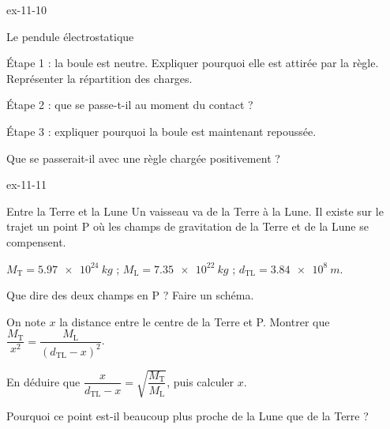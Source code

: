 \begin{blocLivre}{ex-11-10}
\begin{exercice}[2]{Le pendule électrostatique}
\begin{questions}
\item Étape 1 : la boule est neutre. Expliquer pourquoi elle est attirée par la règle. Représenter la répartition des charges.
\item Étape 2 : que se passe-t-il au moment du contact ?
\item Étape 3 : expliquer pourquoi la boule est maintenant repoussée.
\item Que se passerait-il avec une règle chargée positivement ?
\end{questions}
\end{exercice}
\end{blocLivre}
\begin{blocLivre}{ex-11-11}
\begin{exercice}[2]{Entre la Terre et la Lune}
Un vaisseau va de la Terre à la Lune. Il existe sur le trajet un point P où les champs de gravitation de la Terre et de la
Lune se compensent.
\begin{donnees}
$M_\mathrm{T}=\qty{5,97e24}{kg}$ ; $M_\mathrm{L}=\qty{7,35e22}{kg}$ ; $d_\mathrm{TL}=\qty{3,84e8}{m}$.
\end{donnees}
\begin{questions}
\item Que dire des deux champs en P ? Faire un schéma.
\item On note $x$ la distance entre le centre de la Terre et P. Montrer que $\dfrac{M_\mathrm{T}}{x^2}=\dfrac{M_\mathrm{L}}{(d_\mathrm{TL}-x)^2}$.
\item En déduire que $\dfrac{x}{d_\mathrm{TL}-x}=\sqrt{\dfrac{M_\mathrm{T}}{M_\mathrm{L}}}$, puis calculer $x$.
\item Pourquoi ce point est-il beaucoup plus proche de la Lune que de la Terre ?
\end{questions}
\end{exercice}
\end{blocLivre}
